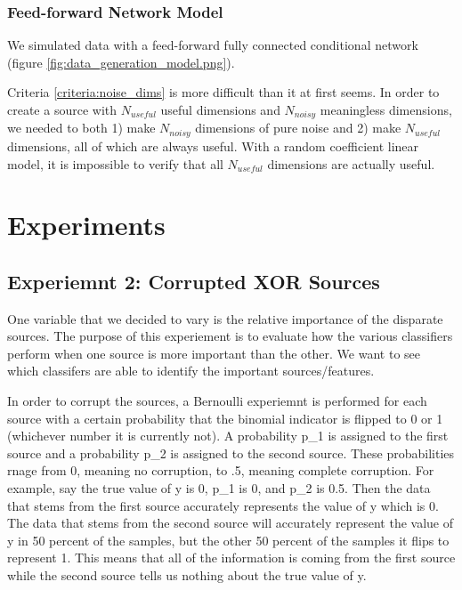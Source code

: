 \documentclass{article}
\begin{document}
\subsubsection{Feed-forward Network Model}

We simulated data with a feed-forward fully connected conditional network
(figure \ref{fig:data_generation_model.png}).


Criteria \ref{criteria:noise_dims} is more difficult than it at first seems. In
order to create a source with $N_{useful}$ useful dimensions and $N_{noisy}$
meaningless dimensions, we needed to both 1) make $N_{noisy}$ dimensions of pure
noise and 2) make $N_{useful}$ dimensions, all of which are always useful. With a
random coefficient linear model, it is impossible to verify that all $N_{useful}$
dimensions are actually useful.


\section{Experiments}









\subsection{Experiemnt 2: Corrupted XOR Sources}

One variable that we decided to vary is the relative importance of the disparate sources. The purpose of this experiement is to evaluate how the various classifiers perform when one source is more important than the other. We want to see which classifers are able to identify the important sources/features.

In order to corrupt the sources, a Bernoulli experiemnt is performed for each source with a certain probability that the binomial indicator is flipped to 0 or 1 (whichever number it is currently not). A probability p_1 is assigned to the first source and a probability p_2 is assigned to the second source. These probabilities rnage from 0, meaning no corruption, to .5, meaning complete corruption. For example, say the true value of y is 0, p_1 is 0, and p_2 is 0.5. Then the data that stems from the first source accurately represents the value of y which is 0. The data that stems from the second source will accurately represent the value of y in 50 percent of the samples, but the other 50 percent of the samples it flips to represent 1. This means that all of the information is coming from the first source while the second source tells us nothing about the true value of y.
\end{document}
